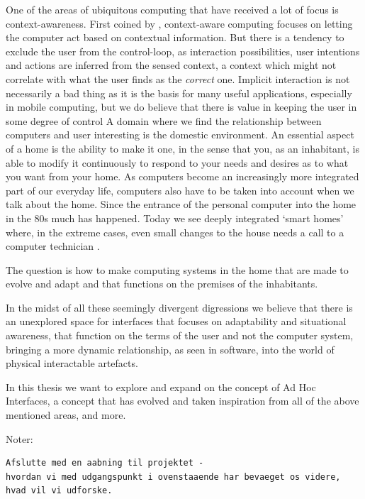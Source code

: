 One of the areas of ubiquitous computing that have received a lot of focus is context-awareness.
First coined by \citet{schilit1994context}, context-aware computing focuses on letting the computer act based on contextual information.
But there is a tendency to exclude the user from the control-loop, as interaction possibilities, user intentions and actions are inferred from the sensed context, a context which might not correlate with what the user finds as the \emph{correct} one.
Implicit interaction is not necessarily a bad thing as it is the basis for many useful applications, especially in mobile computing, but we do believe that there is value in keeping the user in some degree of control
\blank
A domain where we find the relationship between computers and user interesting is the domestic environment.
An essential aspect of a home is the ability to make it one, in the sense that you, as an inhabitant, is able to modify it continuously to respond to your needs and desires as to what you want from your home.
As computers become an increasingly more integrated part of our everyday life, computers also have to be taken into account when we talk about the home.
Since the entrance of the personal computer into the home in the 80s much has happened.
Today we see deeply integrated `smart homes' where, in the extreme cases, even small changes to the house needs a call to a computer technician .

The question is how to make computing systems in the home that are made to evolve and adapt and that functions on the premises of the inhabitants.  

\blank
In the midst of all these seemingly divergent digressions we believe that there is an unexplored space for interfaces that focuses on adaptability and situational awareness, that function on the terms of the user and not the computer system, bringing a more dynamic relationship, as seen in software, into the world of physical interactable artefacts.

In this thesis we want to explore and expand on the concept of Ad Hoc Interfaces, a concept that has evolved and taken inspiration from all of the above mentioned areas, and more. 

Noter:
\begin{verbatim}
Afslutte med en aabning til projektet - 
hvordan vi med udgangspunkt i ovenstaaende har bevaeget os videre,
hvad vil vi udforske.
\end{verbatim}
